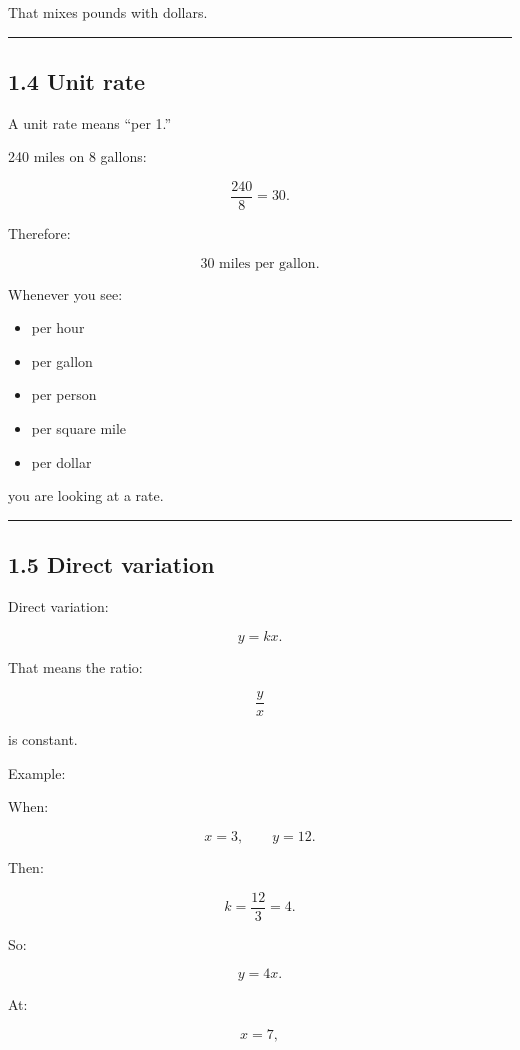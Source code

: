\documentclass[
]{article}
\providecommand{\tightlist}{%
  \setlength{\itemsep}{0pt}\setlength{\parskip}{0pt}}
\begin{document}
That mixes pounds with dollars.

\begin{center}\rule{0.5\linewidth}{0.5pt}\end{center}

\subsection{1.4 Unit rate}\label{unit-rate}

A unit rate means ``per 1.''

240 miles on 8 gallons:

\[
\frac{240}{8}=30.
\]

Therefore:

\[
\boxed{30\text{ miles per gallon}}.
\]

Whenever you see:

\begin{itemize}
\tightlist
\item
  per hour
\item
  per gallon
\item
  per person
\item
  per square mile
\item
  per dollar
\end{itemize}

you are looking at a rate.

\begin{center}\rule{0.5\linewidth}{0.5pt}\end{center}

\subsection{1.5 Direct variation}\label{direct-variation}

Direct variation:

\[
\boxed{y=kx}.
\]

That means the ratio:

\[
\frac yx
\]

is constant.

Example:

When:

\[
x=3,\qquad y=12.
\]

Then:

\[
k=\frac{12}{3}=4.
\]

So:

\[
y=4x.
\]

At:

\[
x=7,
\]
\end{document}
